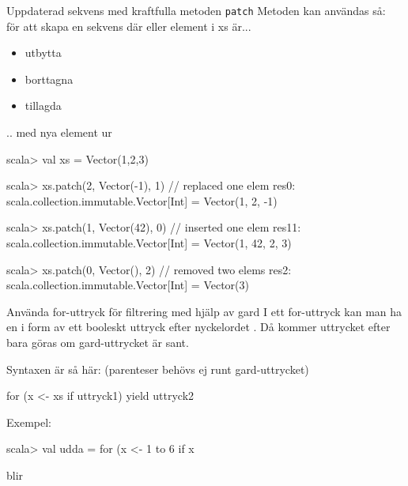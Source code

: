 \begin{Slide}{Uppdaterad sekvens med kraftfulla metoden \texttt{patch}}
  Metoden  kan användas så:  \\för att skapa en  sekvens där  eller  element i xs är...  
  \begin{itemize}
    \item utbytta 
    \item borttagna 
    \item tillagda 
  \end{itemize}
  .. med nya element ur  
\begin{REPL}
scala> val xs = Vector(1,2,3)

scala> xs.patch(2, Vector(-1), 1)     // replaced one elem
res0: scala.collection.immutable.Vector[Int] = Vector(1, 2, -1)

scala> xs.patch(1, Vector(42), 0)     // inserted one elem
res11: scala.collection.immutable.Vector[Int] = Vector(1, 42, 2, 3)

scala> xs.patch(0, Vector(), 2)       // removed two elems
res2: scala.collection.immutable.Vector[Int] = Vector(3)
 
\end{REPL}
\end{Slide}

\begin{Slide}{Använda for-uttryck för filtrering med hjälp av gard}
I ett for-uttryck kan man ha en   i form av ett booleskt uttryck efter nyckelordet . Då kommer uttrycket efter  bara göras om gard-uttrycket är sant.

\vspace{1em}

Syntaxen är så här: (parenteser behövs ej runt gard-uttrycket)
\begin{Code}[basicstyle=\ttfamily\SlideFontSize{12}{14}]
for (x <- xs if uttryck1) yield uttryck2
\end{Code}
\pause
Exempel:
\begin{REPLnonum}
scala> val udda = for (x <- 1 to 6 if x %
\end{REPLnonum}
\pause
{} blir 
\end{Slide}


